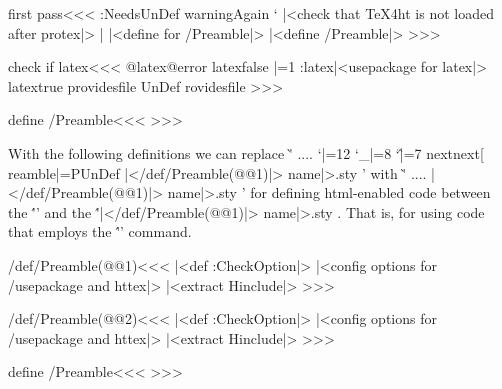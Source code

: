 
\<first pass\><<<
\ifx \Log:Needs\:UnDef \else 
   \:warning{Again `\noexpand}\fi
|<check that TeX4ht is not loaded after protex|>  |%
|<define for /Preamble|>
|<define /Preamble|>
>>>



\<check if latex\><<<
\expandafter\ifx \csname @latex@error\endcsname\relax
    \:latexfalse  \tracingstats|=1
\else  
   \if:latex\else |<usepackage for latex|>\fi
   \:latextrue 
   \ifx \:providesfile \:UnDef
      \let\:providesfile\@providesfile
      \def\@providesfile#1{%
         \expandafter\ifx\csname @filelist\endcsname\relax
               \let\@providesfile\:providesfile
         \else \xdef\@filelist{\@filelist,#1}%
         \fi
         \:providesfile{#1}%
      }
   \fi
\fi
>>>





\<define /Preamble\><<<
\def\:Preamble{\ifx \:next[%
  \def\Preamble[##1]##2{\egroup 
    |</def/Preamble(@@2)|>   
    }
  \else
  \def\Preamble##1{\egroup |</def/Preamble(@@1)|>%
                   name|>.sty }
  \fi        \let\:Preamble|=\:UnDef     \Preamble  }
\def\Preamble{\bgroup  \catcode`\@|=12   \catcode`\_|=8  \catcode`\^|=7
  \futurelet\:next\:Preamble}
>>>


With the following definitions we can replace
\`'   \Htmltrue .... \Htmlfalse \Preamble{html,...}'
with \`'   \Htmltrue ....  \Preamble{...}'  
for defining html-enabled code between the \''' and the
\''\Preamble'.  That is, for using code that employs the
\''\ifHtml' command.



\</def/Preamble(@@1)\><<<
|<def :CheckOption|>%
\ifHtml  \Htmlfalse
     \def\Preamble{html,##1}\else \def\Preamble{##1}\fi
|<config options for /usepackage and httex|>%
|<extract Hinclude|>%
>>>

\</def/Preamble(@@2)\><<<
|<def :CheckOption|>%
\ifHtml  \Htmlfalse
     \def\Preamble{html,##2}\else \def\Preamble{##2}\fi
|<config options for /usepackage and httex|>%
|<extract Hinclude|>%
>>>


\<define /Preamble\><<<
\def\EndPreamble{\b:Preamble \global\let\missing:endpream\empty
  \csname |<live|>\file:id\endcsname \B:DY}
\def\B:DY{|<html paragraph breaks at entry to file|>%
  \HtmlEnv \IgnorePar \IgnoreIndent {\ht:everypar{}\leavevmode}\a:BODY
  \csname a:@BODY\endcsname}
\def\missing:endpream{\:warning{Missing \string\EndPreamble}}
>>>


